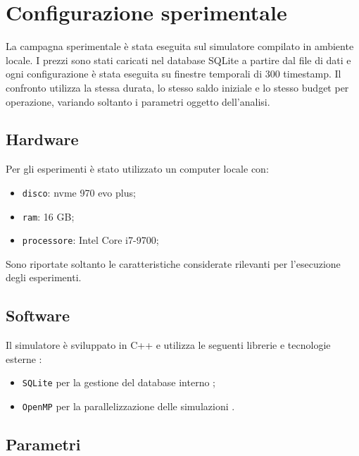 \documentclass[a4paper,oneside,italian]{sapthesis}
\begin{document}

\section{Configurazione sperimentale}

La campagna sperimentale è stata eseguita sul simulatore compilato in
ambiente locale. I prezzi sono stati caricati nel database SQLite a partire
dal file di dati e ogni configurazione è stata eseguita su finestre temporali
di 300 timestamp. Il confronto utilizza la stessa durata, lo stesso saldo
iniziale e lo stesso budget per operazione, variando soltanto i parametri
oggetto dell'analisi.

\subsection{Hardware}

Per gli esperimenti è stato utilizzato un computer locale con:
\begin{itemize}
    \item \texttt{disco}: nvme 970 evo plus;
    \item \texttt{ram}: 16 GB;
    \item \texttt{processore}: Intel Core i7-9700;
\end{itemize}

Sono riportate soltanto le caratteristiche considerate rilevanti per
l'esecuzione degli esperimenti.

\subsection{Software}

Il simulatore è sviluppato in C++ e utilizza le seguenti librerie e tecnologie esterne \cite{cppreference}:
\begin{itemize}
    \item \texttt{SQLite} per la gestione del database interno \cite{sqlite};
    \item \texttt{OpenMP} per la parallelizzazione delle simulazioni \cite{openmp}.
\end{itemize}

\subsection{Parametri}
\end{document}
